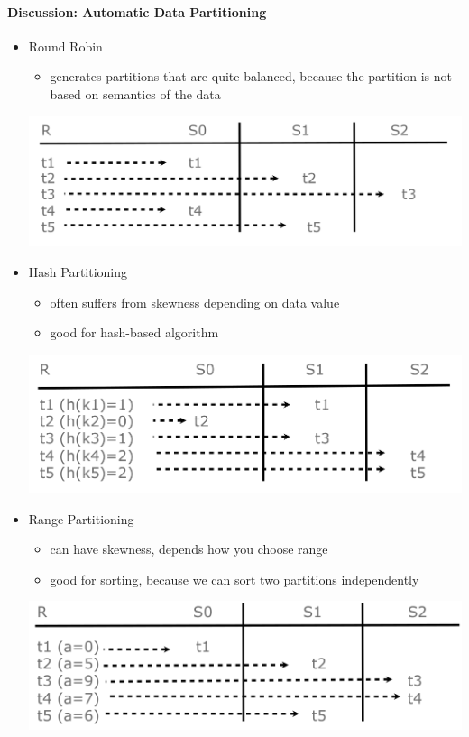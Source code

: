 \paragraph{Discussion: Automatic Data Partitioning}
\begin{itemize}
\item Round Robin
\begin{itemize}
\item generates partitions that are quite balanced, because
  the partition is not based on semantics of the data
\end{itemize}

  \includegraphics[scale=0.15]{graphics/round-robin.png}

\item Hash Partitioning
\begin{itemize}
\item often suffers from skewness depending on data value
\item good for hash-based algorithm
\end{itemize}


  \includegraphics[scale=0.15]{graphics/hash-partitioning.png}

\item Range Partitioning
\begin{itemize}
\item can have skewness, depends how you choose range
\item good for sorting, because we can sort two partitions independently
\end{itemize}

  \includegraphics[scale=0.15]{graphics/range-partitioning.png}
\end{itemize}


